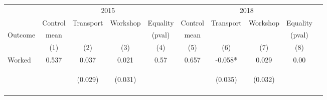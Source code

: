 \begin{tabular}{lccccccccc}
\hline \noalign{\smallskip} & \multicolumn{4}{c}{2015} & \multicolumn{4}{c}{2018} & \\
\cmidrule(lr){2-5}\cmidrule(lr){6-9} & Control & {Transport} & {Workshop} & {Equality} & Control & {Transport} & {Workshop} & {Equality} & \\
Outcome & mean &  &  & (pval) & mean &  &  & (pval) & \\
 & (1) & (2) & (3) & (4) & (5) & (6) & (7) & (8) & \\
\noalign{\smallskip}\hline \noalign{\smallskip}Worked & 0.537 & 0.037 & 0.021 & 0.57 & 0.657 & -0.058* & 0.029 & 0.00 & \\
 & \begin{footnotesize}\end{footnotesize} & \begin{footnotesize}(0.029)\end{footnotesize} & \begin{footnotesize}(0.031)\end{footnotesize} & \begin{footnotesize}\end{footnotesize} & \begin{footnotesize}\end{footnotesize} & \begin{footnotesize}(0.035)\end{footnotesize} & \begin{footnotesize}(0.032)\end{footnotesize} & \begin{footnotesize}\end{footnotesize} & \begin{footnotesize}\end{footnotesize}\\
 & \begin{footnotesize}\end{footnotesize} & \begin{footnotesize}[0.366]\end{footnotesize} & \begin{footnotesize}[1.000]\end{footnotesize} & \begin{footnotesize}\end{footnotesize} & \begin{footnotesize}\end{footnotesize} & \begin{footnotesize}[0.411]\end{footnotesize} & \begin{footnotesize}[0.958]\end{footnotesize} & \begin{footnotesize}\end{footnotesize} & \begin{footnotesize}\end{footnotesize}\\

\end{tabular}
